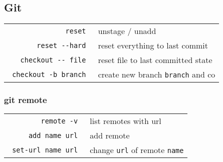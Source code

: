 \begin{multicols*}{3}
\subsection*{Git}
\begin{tabular}{@{}rl@{}}
  \verb| reset | & unstage / unadd \\
  \verb| reset --hard | & reset everything to last commit \\
  \verb| checkout -- file | & reset file to last committed state \\
  \verb| checkout -b branch | & create new branch \verb|branch| and co
\end{tabular}
\subsubsection*{git remote}
\begin{tabular}{@{}rl@{}}
  \verb| remote -v | & list remotes with url \\
  \verb| add name url | & add remote \\
  \verb| set-url name url | & change \verb|url| of remote \verb|name|
\end{tabular}

\end{multicols*}


